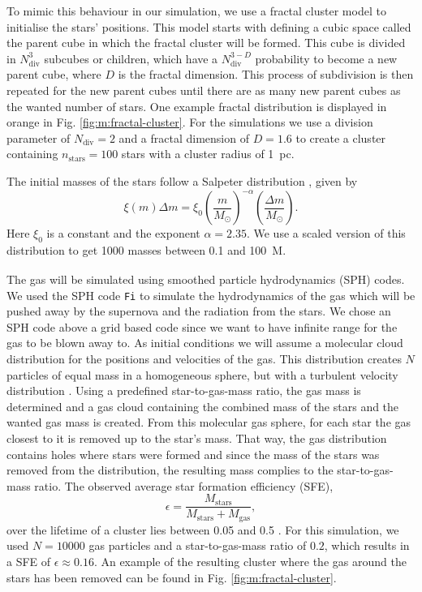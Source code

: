 \documentclass[12pt, twocolumn]{article}
\begin{document}
To mimic this behaviour in our simulation, we use a fractal cluster model \parencite{AMUSE-FractalCluster} to initialise the stars' positions.
This model starts with defining a cubic space called the parent cube in which the fractal cluster will be formed.
This cube is divided in $N_{\text{div}}^3$ subcubes or children, which have a $N_{\text{div}}^{3-D}$ probability to become a new parent cube, where $D$ is the fractal dimension.
This process of subdivision is then repeated for the new parent cubes until there are as many new parent cubes as the wanted number of stars.
One example fractal distribution is displayed in orange in Fig. \ref{fig:m:fractal-cluster}.
For the simulations we use a division parameter of $N_\text{div}=2$ and a fractal dimension of $D=1.6$ to create a cluster containing $n_{\text{stars}} = 100$ stars with a cluster radius of \SI{1}{pc}.

The initial masses of the stars follow a Salpeter distribution \parencite{salpeter}, given by
\begin{equation}
    \xi (m)\Delta m=\xi _{0}\left({\frac {m}{M_{\odot }}}\right)^{-\alpha}\left({\frac {\Delta m}{M_{\odot }}}\right).
\end{equation}
Here $\xi_0$ is a constant and the exponent $\alpha = 2.35$.
We use a scaled version of this distribution to get 1000 masses between 0.1 and \SI{100}{M_{\astrosun}}.

The gas will be simulated using smoothed particle hydrodynamics (SPH) codes.
We used the SPH code \texttt{Fi} \autocite{AMUSE-Fi1, AMUSE-Fi2, AMUSE-Fi3, AMUSE-Fi4} to simulate the hydrodynamics of the gas which will be pushed away by the supernova and the radiation from the stars.
We chose an SPH code above a grid based code since we want to have infinite range for the gas to be blown away to.
As initial conditions we will assume a molecular cloud distribution for the positions and velocities of the gas.
This distribution creates $N$ particles of equal mass in a homogeneous sphere, but with a turbulent velocity distribution \parencite{AMUSE_book, AMUSE-molecular-cloud}.
Using a predefined star-to-gas-mass ratio, the gas mass is determined and a gas cloud containing the combined mass of the stars and the wanted gas mass is created.
From this molecular gas sphere, for each star the gas closest to it is removed up to the star's mass.
That way, the gas distribution contains holes where stars were formed and since the mass of the stars was removed from the distribution, the resulting mass complies to the star-to-gas-mass ratio.
The observed average star formation efficiency (SFE), 
\begin{equation}
\epsilon = \frac{M_{\text{stars}}}{M_{\text{stars}}+M_{\text{gas}}},
\end{equation}
over the lifetime of a cluster lies between 0.05 and 0.5 \parencite{star-formation-efficiency}.
For this simulation, we used $N=\num{10000}$ gas particles and a star-to-gas-mass ratio of $0.2$, which results in a SFE of $\epsilon \approx 0.16$.
An example of the resulting cluster where the gas around the stars has been removed can be found in Fig. \ref{fig:m:fractal-cluster}.
\end{document}
